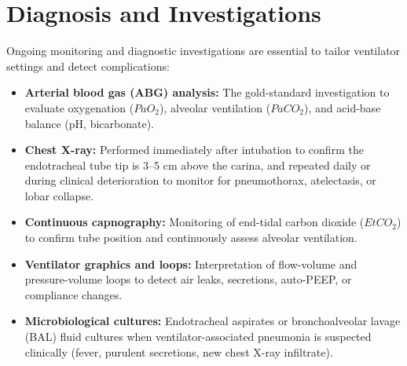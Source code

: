 \section*{Diagnosis and Investigations}
Ongoing monitoring and diagnostic investigations are essential to tailor ventilator settings and detect complications:
\begin{itemize}
    \item \textbf{Arterial blood gas (ABG) analysis:} The gold-standard investigation to evaluate oxygenation ($PaO_2$), alveolar ventilation ($PaCO_2$), and acid-base balance (pH, bicarbonate).
    \item \textbf{Chest X-ray:} Performed immediately after intubation to confirm the endotracheal tube tip is 3--5 cm above the carina, and repeated daily or during clinical deterioration to monitor for pneumothorax, atelectasis, or lobar collapse.
    \item \textbf{Continuous capnography:} Monitoring of end-tidal carbon dioxide ($EtCO_2$) to confirm tube position and continuously assess alveolar ventilation.
    \item \textbf{Ventilator graphics and loops:} Interpretation of flow-volume and pressure-volume loops to detect air leaks, secretions, auto-PEEP, or compliance changes.
    \item \textbf{Microbiological cultures:} Endotracheal aspirates or bronchoalveolar lavage (BAL) fluid cultures when ventilator-associated pneumonia is suspected clinically (fever, purulent secretions, new chest X-ray infiltrate).
\end{itemize}

